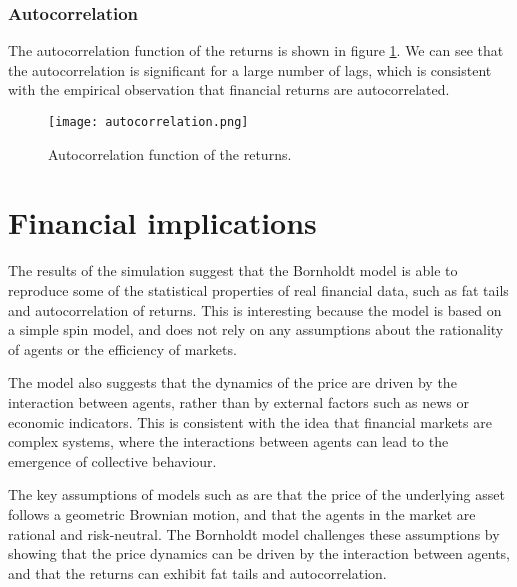 \subsubsection{Autocorrelation}
The autocorrelation function of the returns is shown in figure \ref{fig:autocorrelation}. We can see that the autocorrelation is significant for a large number of lags, which is consistent with the empirical observation that financial returns are autocorrelated.

\begin{figure}[H]
    \centering
    \texttt{[image: autocorrelation.png]}
    \caption{Autocorrelation function of the returns.}
    \label{fig:autocorrelation}
\end{figure}

\section{Financial implications}
The results of the simulation suggest that the Bornholdt model is able to reproduce some of the statistical properties of real financial data, such as fat tails and autocorrelation of returns. This is interesting because the model is based on a simple spin model, and does not rely on any assumptions about the rationality of agents or the efficiency of markets.

The model also suggests that the dynamics of the price are driven by the interaction between agents, rather than by external factors such as news or economic indicators. This is consistent with the idea that financial markets are complex systems, where the interactions between agents can lead to the emergence of collective behaviour.

The key assumptions of models such as \cite{black_scholes} are that the price of the underlying asset follows a geometric Brownian motion, and that the agents in the market are rational and risk-neutral. The Bornholdt model challenges these assumptions by showing that the price dynamics can be driven by the interaction between agents, and that the returns can exhibit fat tails and autocorrelation.